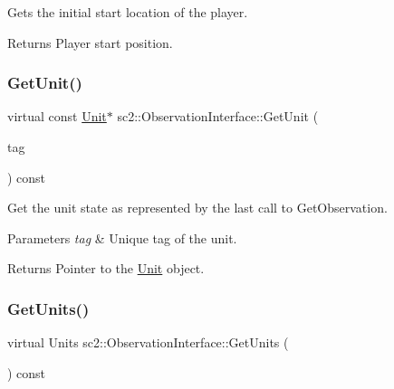 Gets the initial start location of the player. \begin{DoxyReturn}{Returns}
Player start position. 
\end{DoxyReturn}
\mbox{\label{classsc2_1_1_observation_interface_a0f766e5a6522a6966b4d2abf0a2daff2}} 
\subsubsection{\texorpdfstring{Get\+Unit()}{GetUnit()}}
{\footnotesize\ttfamily virtual const \hyperlink{classsc2_1_1_unit}{Unit}$\ast$ sc2\+::\+Observation\+Interface\+::\+Get\+Unit (\begin{DoxyParamCaption}\item[{Tag}]{tag }\end{DoxyParamCaption}) const\hspace{0.3cm}{\ttfamily [pure virtual]}}

Get the unit state as represented by the last call to Get\+Observation. 
\begin{DoxyParams}{Parameters}
{\em tag} & Unique tag of the unit. \\
\hline
\end{DoxyParams}
\begin{DoxyReturn}{Returns}
Pointer to the \hyperlink{classsc2_1_1_unit}{Unit} object. 
\end{DoxyReturn}
\mbox{\label{classsc2_1_1_observation_interface_adf2e86998034eed0c91b558848b68f44}} 
\subsubsection{\texorpdfstring{Get\+Units()}{GetUnits()}\hspace{0.1cm}{\footnotesize\ttfamily [1/3]}}
{\footnotesize\ttfamily virtual Units sc2\+::\+Observation\+Interface\+::\+Get\+Units (\begin{DoxyParamCaption}{ }\end{DoxyParamCaption}) const\hspace{0.3cm}{\ttfamily [pure virtual]}}

